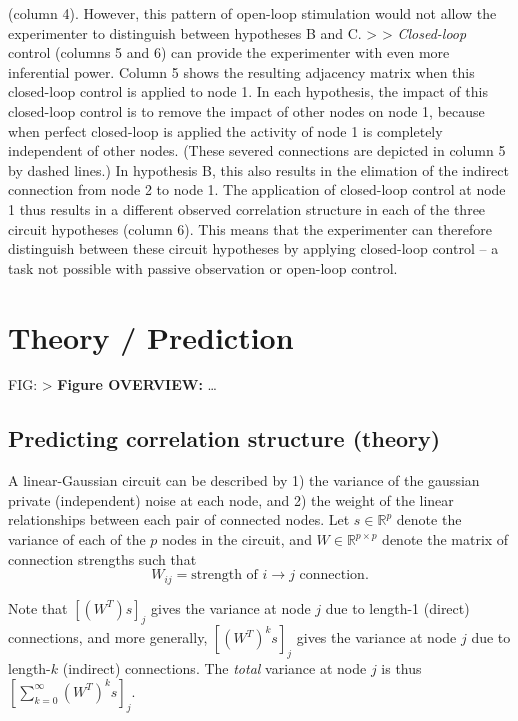 (column 4). However, this pattern of open-loop stimulation would not
allow the experimenter to distinguish between hypotheses B and C.
\textgreater{} \textgreater{} \emph{Closed-loop} control (columns 5 and
6) can provide the experimenter with even more inferential power. Column
5 shows the resulting adjacency matrix when this closed-loop control is
applied to node 1. In each hypothesis, the impact of this closed-loop
control is to remove the impact of other nodes on node 1, because when
perfect closed-loop is applied the activity of node 1 is completely
independent of other nodes. (These severed connections are depicted in
column 5 by dashed lines.) In hypothesis B, this also results in the
elimation of the indirect connection from node 2 to node 1. The
application of closed-loop control at node 1 thus results in a different
observed correlation structure in each of the three circuit hypotheses
(column 6). This means that the experimenter can therefore distinguish
between these circuit hypotheses by applying closed-loop control -- a
task not possible with passive observation or open-loop control.

\hypertarget{theory-prediction}{%
\section{Theory / Prediction}\label{theory-prediction}}

FIG: %
\textgreater{} \textbf{Figure OVERVIEW:} \ldots{}

\hypertarget{predicting-correlation-structure-theory}{%
\subsection{Predicting correlation structure
(theory)}\label{predicting-correlation-structure-theory}}

A linear-Gaussian circuit can be described by 1) the variance of the
gaussian private (independent) noise at each node, and 2) the weight of
the linear relationships between each pair of connected nodes. Let
\(s \in \mathbb{R}^p\) denote the variance of each of the \(p\) nodes in
the circuit, and \(W \in \mathbb{R}^{p \times p}\) denote the matrix of
connection strengths such that
\[W_{ij} = \text{strength of $i \to j$ connection}.\]

Note that \(\left[(W^T) s\right]_j\) gives the variance at node \(j\)
due to length-1 (direct) connections, and more generally,
\(\left[ (W^T)^k s \right]_j\) gives the variance at node \(j\) due to
length-\(k\) (indirect) connections. The \emph{total} variance at node
\(j\) is thus \(\left[ \sum_{k=0}^{\infty} (W^T)^k s \right]_j\).

